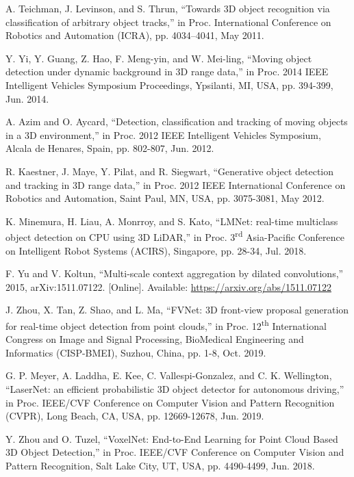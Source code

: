 \documentclass{ieeeaccess}
\begin{document}
\begin{thebibliography}{00}
 A. Teichman, J. Levinson, and S. Thrun, ``Towards 3D object recognition via classification of arbitrary object tracks,'' in Proc. International Conference on Robotics and Automation (ICRA), pp. 4034–4041, May 2011.

 Y. Yi, Y. Guang, Z. Hao, F. Meng-yin, and W. Mei-ling, ``Moving object detection under dynamic background in 3D range data,'' in Proc. 2014 IEEE Intelligent Vehicles Symposium Proceedings, Ypsilanti, MI, USA, pp. 394-399, Jun. 2014.

 A. Azim and O. Aycard, ``Detection, classification and tracking of moving objects in a 3D environment,'' in Proc. 2012 IEEE Intelligent Vehicles Symposium, Alcala de Henares, Spain, pp. 802-807, Jun. 2012.

 R. Kaestner, J. Maye, Y. Pilat, and R. Siegwart, ``Generative object detection and tracking in 3D range data,'' in Proc. 2012 IEEE International Conference on Robotics and Automation, Saint Paul, MN, USA, pp. 3075-3081, May 2012.

 K. Minemura, H. Liau, A. Monrroy, and S. Kato, ``LMNet: real-time multiclass object detection on CPU using 3D LiDAR,'' in Proc. 3\textsuperscript{rd} Asia-Pacific Conference on Intelligent Robot Systems (ACIRS), Singapore, pp. 28-34, Jul. 2018.

 F. Yu and V. Koltun, ``Multi-scale context aggregation by dilated convolutions,'' 2015, arXiv:1511.07122. [Online]. Available: \underline{https://arxiv.org/abs/1511.07122}

 J. Zhou, X. Tan, Z. Shao, and L. Ma, ``FVNet: 3D front-view proposal generation for real-time object detection from point clouds,'' in Proc. 12\textsuperscript{th} International Congress on Image and Signal Processing, BioMedical Engineering and Informatics (CISP-BMEI), Suzhou, China, pp. 1-8, Oct. 2019.

 G. P. Meyer, A. Laddha, E. Kee, C. Vallespi-Gonzalez, and C. K. Wellington, ``LaserNet: an efficient probabilistic 3D object detector for autonomous driving,'' in Proc. IEEE/CVF Conference on Computer Vision and Pattern Recognition (CVPR), Long Beach, CA, USA, pp. 12669-12678, Jun. 2019.

 Y. Zhou and O. Tuzel, ``VoxelNet: End-to-End Learning for Point Cloud Based 3D Object Detection,'' in Proc. IEEE/CVF Conference on Computer Vision and Pattern Recognition, Salt Lake City, UT, USA, pp. 4490-4499, Jun. 2018.


\end{thebibliography}
\end{document}
